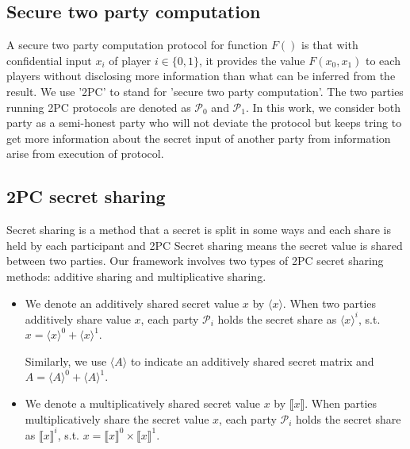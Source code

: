 \documentclass[letterpaper]{article} %
\begin{document}
    \subsection{Secure two party computation}

    A secure two party computation protocol for function $F()$ is that
    with confidential input $x_{i}$ of player $i \in \{0,1\} $,
    it provides the value $F(x_{0},x_{1})$ to each players
    without disclosing more information than what can be inferred from the result.
    We use '2PC' to stand for 'secure two party computation'.
    The two parties running 2PC protocols are denoted as $\mathcal{P}_{0} $ and $\mathcal{P}_{1}$.
    In this work, we consider both party as a semi-honest party
    who will not deviate the protocol but keeps tring to get more information about
    the secret input of another party from information arise from execution of protocol.


    \subsection{2PC secret sharing}
    Secret sharing is a method that a secret is split in some ways and each share is held by each participant
    and 2PC Secret sharing means the secret value is shared between two parties.
    Our framework involves two types of 2PC secret sharing methods:
    additive sharing and multiplicative sharing.

    \begin{itemize}
        \item
        We denote an additively shared secret value $x$ by $\langle x\rangle $.
        When two parties additively share value $x$,
        each party $\mathcal{P}_{i}$ holds the secret share as $\langle x\rangle ^{i}$, s.t.
        $x=\langle x\rangle ^{0}+\langle x\rangle ^{1}$.

        Similarly, we use $\langle A\rangle $ to indicate an additively shared secret matrix
        and $A =\langle A\rangle ^{0}+\langle A\rangle ^{1}$.

        \item We denote a multiplicatively shared secret value $x$ by $\llbracket x \rrbracket$.
        When parties multiplicatively share the secret value $x$,
        each party $\mathcal{P}_{i}$ holds the secret share as $\llbracket x \rrbracket ^{i}$, s.t.
        $x=\llbracket x \rrbracket ^{0}\times \llbracket x \rrbracket ^{1}$.

    \end{itemize}
\end{document}
